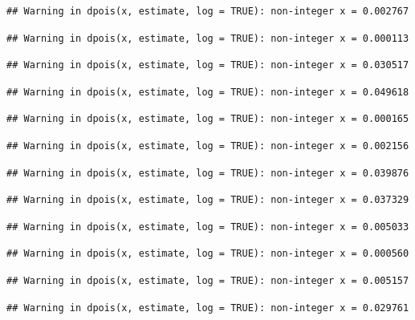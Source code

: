 \documentclass[]{article}
\begin{document}
\begin{verbatim}
## Warning in dpois(x, estimate, log = TRUE): non-integer x = 0.002767
\end{verbatim}

\begin{verbatim}
## Warning in dpois(x, estimate, log = TRUE): non-integer x = 0.000113
\end{verbatim}

\begin{verbatim}
## Warning in dpois(x, estimate, log = TRUE): non-integer x = 0.030517
\end{verbatim}

\begin{verbatim}
## Warning in dpois(x, estimate, log = TRUE): non-integer x = 0.049618
\end{verbatim}

\begin{verbatim}
## Warning in dpois(x, estimate, log = TRUE): non-integer x = 0.000165
\end{verbatim}

\begin{verbatim}
## Warning in dpois(x, estimate, log = TRUE): non-integer x = 0.002156
\end{verbatim}

\begin{verbatim}
## Warning in dpois(x, estimate, log = TRUE): non-integer x = 0.039876
\end{verbatim}

\begin{verbatim}
## Warning in dpois(x, estimate, log = TRUE): non-integer x = 0.037329
\end{verbatim}

\begin{verbatim}
## Warning in dpois(x, estimate, log = TRUE): non-integer x = 0.005033
\end{verbatim}

\begin{verbatim}
## Warning in dpois(x, estimate, log = TRUE): non-integer x = 0.000560
\end{verbatim}

\begin{verbatim}
## Warning in dpois(x, estimate, log = TRUE): non-integer x = 0.005157
\end{verbatim}

\begin{verbatim}
## Warning in dpois(x, estimate, log = TRUE): non-integer x = 0.029761
\end{verbatim}
\end{document}
